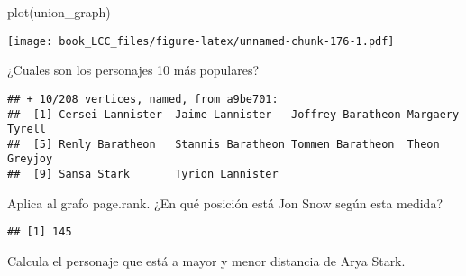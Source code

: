 \documentclass[
]{book}
\newenvironment{Shaded}{\begin{snugshade}}{\end{snugshade}}
\newcommand{\AttributeTok}[1]{\textcolor[rgb]{0.77,0.63,0.00}{#1}}
\newcommand{\ConstantTok}[1]{\textcolor[rgb]{0.00,0.00,0.00}{#1}}
\newcommand{\DecValTok}[1]{\textcolor[rgb]{0.00,0.00,0.81}{#1}}
\newcommand{\FunctionTok}[1]{\textcolor[rgb]{0.00,0.00,0.00}{#1}}
\newcommand{\NormalTok}[1]{#1}
\newcommand{\OtherTok}[1]{\textcolor[rgb]{0.56,0.35,0.01}{#1}}
\newcommand{\SpecialCharTok}[1]{\textcolor[rgb]{0.00,0.00,0.00}{#1}}
\newcommand{\StringTok}[1]{\textcolor[rgb]{0.31,0.60,0.02}{#1}}
\begin{document}
\begin{Shaded}
\begin{Highlighting}[]
\FunctionTok{plot}\NormalTok{(union\_graph)}
\end{Highlighting}
\end{Shaded}

\texttt{[image: book\_LCC\_files/figure-latex/unnamed-chunk-176-1.pdf]}

¿Cuales son los personajes 10 más populares?

\begin{Shaded}
\end{Shaded}

\begin{verbatim}
## + 10/208 vertices, named, from a9be701:
##  [1] Cersei Lannister  Jaime Lannister   Joffrey Baratheon Margaery Tyrell  
##  [5] Renly Baratheon   Stannis Baratheon Tommen Baratheon  Theon Greyjoy    
##  [9] Sansa Stark       Tyrion Lannister
\end{verbatim}

Aplica al grafo page.rank. ¿En qué posición está Jon Snow según esta medida?

\begin{Shaded}
\end{Shaded}

\begin{verbatim}
## [1] 145
\end{verbatim}

Calcula el personaje que está a mayor y menor distancia de Arya Stark.
\end{document}

